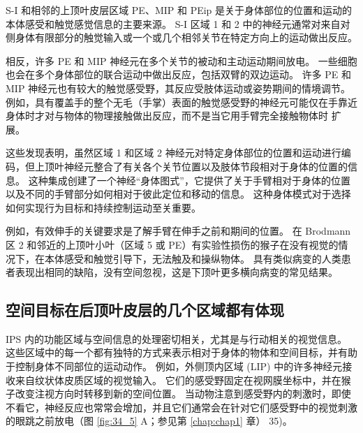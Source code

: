 S-I 和相邻的上顶叶皮层区域 PE、MIP 和 PEip 是关于身体部位的位置和运动的本体感受和触觉感觉信息的主要来源。
S-I 区域 1 和 2 中的神经元通常对来自对侧身体有限部分的触觉输入或一个或几个相邻关节在特定方向上的运动做出反应。


相反，许多 PE 和 MIP 神经元在多个关节的被动和主动运动期间放电。
一些细胞也会在多个身体部位的联合运动中做出反应，包括双臂的双边运动。
许多 PE 和 MIP 神经元也有较大的触觉感受野，其反应受肢体运动或姿势期间的情境调节。
例如，具有覆盖手的整个无毛（手掌）表面的触觉感受野的神经元可能仅在手靠近身体时才对与物体的物理接触做出反应，而不是当它用手臂完全接触物体时 扩展。


这些发现表明，虽然区域 1 和区域 2 神经元对特定身体部位的位置和运动进行编码，但上顶叶神经元整合了有关各个关节位置以及肢体节段相对于身体的位置的信息。
这种集成创建了一个神经“身体图式”，它提供了关于手臂相对于身体的位置以及不同的手臂部分如何相对于彼此定位和移动的信息。
这种身体模式对于选择如何实现行为目标和持续控制运动至关重要。


例如，有效伸手的关键要求是了解手臂在伸手之前和期间的位置。
在 Brodmann 区 2 和邻近的上顶叶小叶（区域 5 或 PE）有实验性损伤的猴子在没有视觉的情况下，在本体感受和触觉引导下，无法触及和操纵物体。
具有类似病变的人类患者表现出相同的缺陷，没有空间忽视，这是下顶叶更多横向病变的常见结果。



\subsection{空间目标在后顶叶皮层的几个区域都有体现}

IPS 内的功能区域与空间信息的处理密切相关，尤其是与行动相关的视觉信息。
这些区域中的每一个都有独特的方式来表示相对于身体的物体和空间目标，并有助于控制身体不同部位的运动动作。
例如，外侧顶内区域 (LIP) 中的许多神经元接收来自纹状体皮质区域的视觉输入。
它们的感受野固定在视网膜坐标中，并在猴子改变注视方向时转移到新的空间位置。
当动物注意到感受野内的刺激时，即使不看它，神经反应也常常会增加，并且它们通常会在针对它们感受野中的视觉刺激的眼跳之前放电（图 \ref{fig:34_5} A；参见第 \ref{chap:chap1} 章） 35)。


